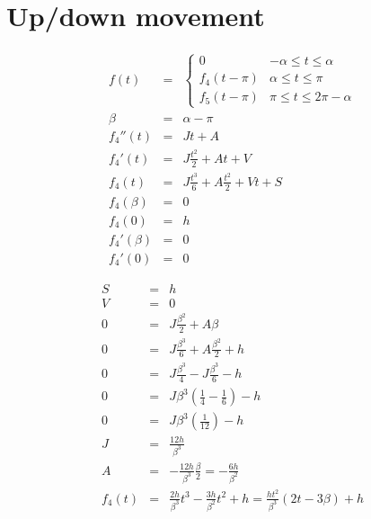 \documentclass[a4,draft]{article}
\begin{document}
\section{Up/down movement}
\begin{eqnarray}
  f(t) &=& \begin{cases} 
    0 & -\alpha \leq t \le  \alpha\\
    f_4(t - \pi) & \alpha \leq t \le \pi \\
    f_5(t - \pi) & \pi \leq t \le  2\pi -\alpha
  \end{cases}\\
  \beta &=& \alpha - \pi \\
  f_4''(t) &=& Jt + A \\
  f_4'(t) &=& J\frac{t^2}{2} + At + V \\
  f_4(t) &=& J\frac{t^3}{6} + A\frac{t^2}{2} + Vt + S \\
  f_4(\beta) &=& 0 \\
  f_4(0) &=& h\\
  f_4'(\beta) &=& 0 \\
  f_4'(0) &=& 0
\end{eqnarray}

\begin{eqnarray}
  S &=& h \\
  V &=& 0 \\
  0 &=& J\frac{\beta^2}{2} + A\beta \\
  0 &=& J\frac{\beta^3}{6} + A\frac{\beta^2}{2} + h\\
  0 &=& J\frac{\beta^3}{4} - J\frac{\beta^3}{6} - h\\
  0 &=& J\beta^3\left(\frac{1}{4} - \frac{1}{6}\right) - h\\
  0 &=& J\beta^3\left(\frac{1}{12}\right) - h\\
  J &=& \frac{12h}{\beta^3} \\
  A&=&-\frac{12h}{\beta^3}\frac{\beta}{2}=-\frac{6h}{\beta^2}\\
  f_4(t) &=& \frac{2h}{\beta^3}t^3 - \frac{3h}{\beta^2}t^2 + h = \frac{ht^2}{\beta^3}(2t - 3\beta) + h
\end{eqnarray}
\end{document}
